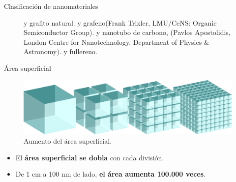 \documentclass[aspectratio=169]{beamer}
\begin{document}
\begin{frame}{Clasificación de nanomateriales}
\begin{figure}
\begin{subfigure}[b]{0.15\textwidth}
				\caption{}
				\label{fig:fullerene_image}
			\end{subfigure}
			\caption[Alótropos del carbono mostrando las diferentes dimensionalidades de los nanomateriales]{ y  grafito natural.  y  grafeno(Frank Trixler, LMU/CeNS: Organic Semiconductor Group).  y  nanotubo de carbono, (Pavlos Apostolidis, London Centre for Nanotechnology, Department of Physics \& Astronomy).  y  fullereno\citep{Gimenez2011}.}
			\label{fig:carbon_allotropes}
		\end{figure}
	\end{frame}

	\begin{frame}{Área superficial}
		\begin{figure}
			\includegraphics[width=\textwidth]{area_cubes.pdf}
			\caption{Aumento del área superficial.}
		\end{figure}
		\begin{itemize}[<+(1)->]
			\item El \textbf{área superficial se dobla} con cada división.
			\item De 1 cm a 100 nm de lado, \textbf{el área aumenta 100.000 veces}.
		\end{itemize}
	\end{frame}
\end{document}
